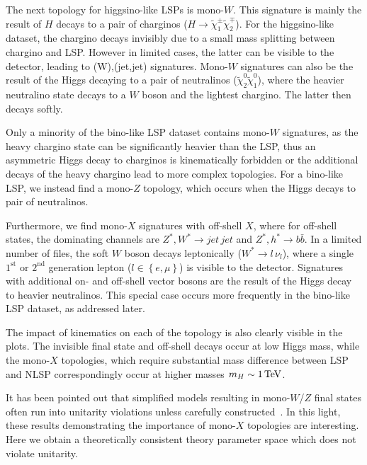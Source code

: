 \documentclass[11pt,a4paper]{article}
\begin{document}
The next topology for higgsino-like LSPs is mono-$W$. This signature is mainly the result of $H$ decays to a pair of charginos ($H\rightarrow\tilde{\chi}_1^\pm\tilde{\chi}_2^\mp$). For the higgsino-like dataset, the chargino decays invisibly due to a small mass splitting between chargino and LSP. However in limited cases, the latter can be visible to the detector, leading to (W),(jet,jet) signatures. Mono-$W$ signatures can also be the result of the Higgs decaying to a pair of neutralinos  ($\tilde\chi^0_2\tilde\chi^0_1$), where the heavier neutralino state decays to a $W$ boson and the lightest chargino. The latter then decays softly.

Only a minority of the bino-like LSP dataset contains mono-$W$ signatures, as the heavy chargino state can be significantly heavier than the LSP, thus an asymmetric Higgs decay to charginos is kinematically forbidden or the additional decays of the heavy chargino lead to more complex topologies. For a bino-like LSP, we instead find a mono-$Z$ topology, which occurs when the Higgs decays to pair of neutralinos. 

Furthermore, we find mono-$X$ signatures with off-shell $X$, where for off-shell states, the dominating channels are $Z^*,W^*\rightarrow jet\,jet$ and $Z^*,h^*\rightarrow b\bar{b}$. In a limited number of files,  the soft $W$ boson decays leptonically ($W^*\rightarrow l\,\nu_l$), where a single $1^\text{st}$ or $2^\text{nd}$ generation lepton ($l \in \left\lbrace e,\mu\right\rbrace$) is visible to the detector. Signatures with additional on- and off-shell vector bosons are the result of the Higgs decay to heavier neutralinos. This special case occurs more frequently in the bino-like LSP dataset, as addressed later.

The impact of kinematics on each of the topology is also clearly visible in the plots. The invisible final state and off-shell decays occur at low Higgs mass, while the mono-$X$ topologies, which require substantial mass difference between LSP and NLSP correspondingly occur at higher masses $m_H\sim 1\, \rm{TeV}$. 

It has been pointed out that simplified models resulting in mono-$W$/$Z$ final states often run into unitarity violations unless carefully constructed~\cite{Haisch:2016usn}. In this light, these results demonstrating the importance of mono-$X$ topologies are interesting. Here we obtain a theoretically consistent theory parameter space which does not violate unitarity.
\end{document}
